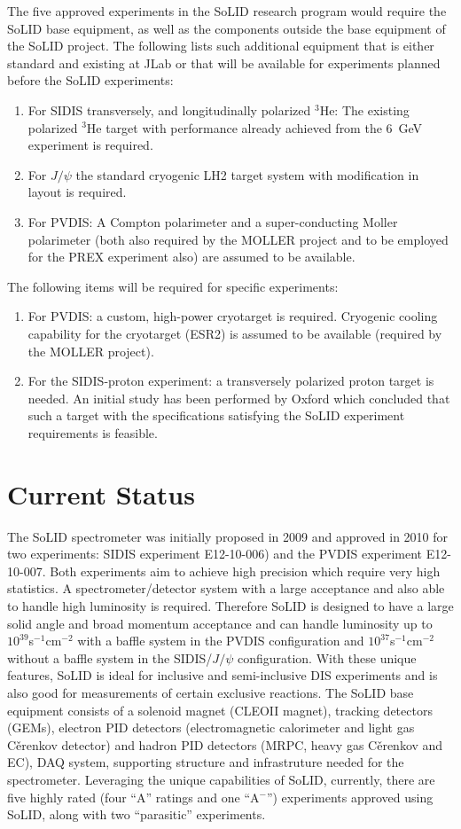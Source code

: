 \documentclass[12pt]{article}
\begin{document}
 The five approved experiments in the SoLID research program would require the SoLID base equipment, as well as the components outside the base equipment of the SoLID project. 
The following lists such additional equipment that is either standard and existing at JLab or that will be available for experiments planned before the SoLID experiments: 
     \begin{enumerate}
\item{For SIDIS transversely, and longitudinally polarized $^3$He: The existing polarized $^3$He target with performance already achieved from the 6~GeV experiment is required.}
\item{ For $J/\psi$ the standard cryogenic LH2 target system with modification in layout is required. }
\item{ For PVDIS: A Compton polarimeter and a super-conducting Moller polarimeter (both also required by the MOLLER project and to be employed for the PREX experiment also) are assumed to be available.}
    \end{enumerate}
 The following items will be required for specific experiments:
 \begin{enumerate}
     \item{ For PVDIS:  a custom, high-power cryotarget is required. Cryogenic cooling capability for the cryotarget (ESR2) is assumed to be available (required by the MOLLER project). }
     \item{ For the SIDIS-proton experiment: a transversely polarized proton target is needed. An initial study has been performed by Oxford which 
concluded that such a target with the specifications satisfying the SoLID experiment requirements is feasible.}
 \end{enumerate}

\section{Current Status}
The SoLID spectrometer was initially proposed in 2009 and approved in 2010 for two experiments:
SIDIS experiment E12-10-006) and the PVDIS experiment E12-10-007. Both experiments aim to achieve high precision which 
require very high statistics. A spectrometer/detector system with a large acceptance 
and also able to handle high luminosity is required. Therefore SoLID is designed to 
have a large solid angle and broad momentum acceptance and can handle luminosity
up to $10^{39}$s$^{-1}$cm$^{-2}$ with a baffle system in the PVDIS configuration and  $10^{37}$s$^{-1}$cm$^{-2}$ without 
a baffle system in the SIDIS/$J/\psi$ configuration. With these unique features, SoLID is ideal for inclusive and semi-inclusive
DIS experiments and is also good for measurements of certain exclusive reactions.
The SoLID base equipment consists of a solenoid magnet (CLEOII magnet), tracking detectors (GEMs), electron PID detectors
(electromagnetic calorimeter and light gas C\v{e}renkov detector) and hadron PID detectors (MRPC, heavy gas C\v{e}renkov
and EC), DAQ system, supporting structure and infrastruture needed for the spectrometer. 
Leveraging the unique capabilities of SoLID, currently, there are
five highly rated (four ``A'' ratings and one ``A$^-$'') experiments approved using SoLID, along with two 
``parasitic'' experiments. 
\end{document}
